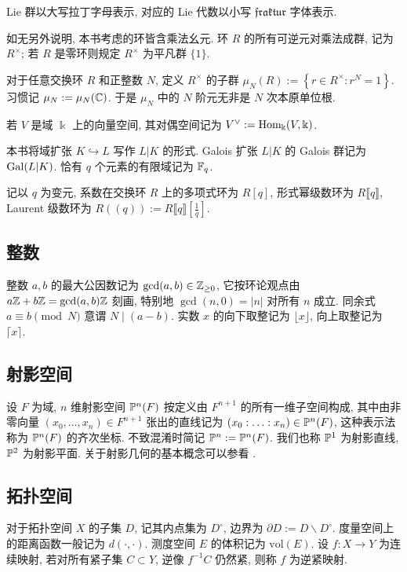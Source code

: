 Lie 群以大写拉丁字母表示, 对应的 Lie 代数以小写 $\mathfrak{fraktur}$ 字体表示.

如无另外说明, 本书考虑的环皆含乘法幺元. 环 $R$ 的所有可逆元对乘法成群, 记为 $R^\times$; 若 $R$ 是零环则规定 $R^\times$ 为平凡群 $\{1\}$.

对于任意交换环 $R$ 和正整数 $N$, 定义 $R^\times$ 的子群 $\mu_N(R) := \left\{ r \in R^\times: r^N = 1 \right\}$. 习惯记 $\mu_N := \mu_N(\mathbb{C})$. 于是 $\mu_N$ 中的 $N$ 阶元无非是 $N$ 次本原单位根. 

若 $V$ 是域 $\Bbbk$ 上的向量空间, 其对偶空间记为 $V^\vee := \operatorname{Hom}_\Bbbk(V, \Bbbk)$. 

本书将域扩张 $K \hookrightarrow L$ 写作 $L|K$ 的形式. Galois 扩张 $L|K$ 的 Galois 群记为 $\operatorname{Gal}(L|K)$. 恰有 $q$ 个元素的有限域记为 $\mathbb{F}_q$. 

记以 $q$ 为变元, 系数在交换环 $R$ 上的多项式环为 $R[q]$, 形式幂级数环为 $R\llbracket q \rrbracket$, Laurent 级数环为 $R(\!(q)\!) := R\llbracket q\rrbracket \left[\frac{1}{q}\right]$.

\subsection*{整数} 
整数 $a,b$ 的最大公因数记为 $\gcd(a,b) \in \mathbb{Z}_{\geq 0}$, 它按环论观点由 $a\mathbb{Z} + b\mathbb{Z} = \gcd(a,b) \mathbb{Z}$ 刻画, 特别地 $\gcd(n,0) = |n|$ 对所有 $n$ 成立. 同余式 $a \equiv b \pmod N$ 意谓 $N \mid (a-b)$. 实数 $x$ 的向下取整记为 $\lfloor x \rfloor$, 向上取整记为 $\lceil x \rceil$.

\subsection*{射影空间}
设 $F$ 为域, $n$ 维射影空间 $\mathbb{P}^n(F)$ 按定义由 $F^{n+1}$ 的所有一维子空间构成, 其中由非零向量 $(x_0, \ldots, x_n) \in F^{n+1}$ 张出的直线记为 $(x_0 : \ldots : x_n) \in \mathbb{P}^n(F)$, 这种表示法称为 $\mathbb{P}^n(F)$ 的齐次坐标. 不致混淆时简记 $\mathbb{P}^n := \mathbb{P}^n(F)$. 我们也称 $\mathbb{P}^1$ 为射影直线, $\mathbb{P}^2$ 为射影平面. 关于射影几何的基本概念可以参看 \cite[\S 5.3]{Xi18}.  

\subsection*{拓扑空间}
对于拓扑空间 $X$ 的子集 $D$, 记其内点集为 $D^\circ$, 边界为 $\partial D := D \smallsetminus D^\circ$. 度量空间上的距离函数一般记为 $d(\cdot, \cdot)$. 测度空间 $E$ 的体积记为 $\mathrm{vol}(E)$. 设 $f: X \to Y$ 为连续映射, 若对所有紧子集 $C \subset Y$, 逆像 $f^{-1}C$ 仍然紧, 则称 $f$ 为逆紧映射.

